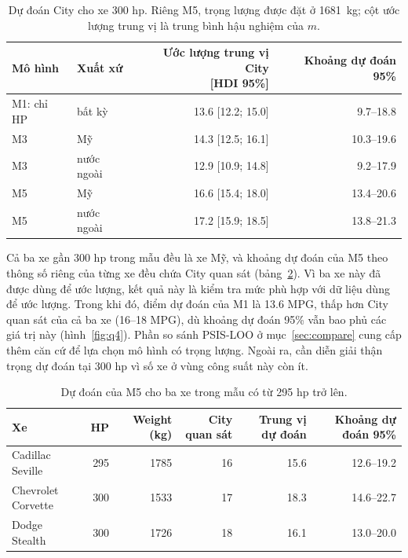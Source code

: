 \documentclass[12pt,a4paper]{report}
\begin{document}
\begin{table}[tp]
  \centering
  \caption{Dự đoán City cho xe 300 hp. Riêng M5, trọng lượng được đặt ở
    \SI{1681}{kg}; cột ước lượng trung vị là trung bình hậu nghiệm của $m$.}
  \label{tab:q4}
  \begin{tabular}{llrr}
    \toprule
    Mô hình & Xuất xứ & \shortstack{Ước lượng trung vị City\\{[HDI 95\%]}} & Khoảng dự đoán 95\% \\
    \midrule
    M1: chỉ HP & bất kỳ      & \num{13.6} [\num{12.2}; \num{15.0}] & \num{9.7}--\num{18.8} \\
    M3         & Mỹ          & \num{14.3} [\num{12.5}; \num{16.1}] & \num{10.3}--\num{19.6} \\
    M3         & nước ngoài  & \num{12.9} [\num{10.9}; \num{14.8}] & \num{9.2}--\num{17.9} \\
    M5         & Mỹ          & \num{16.6} [\num{15.4}; \num{18.0}] & \num{13.4}--\num{20.6} \\
    M5         & nước ngoài  & \num{17.2} [\num{15.9}; \num{18.5}] & \num{13.8}--\num{21.3} \\
    \bottomrule
  \end{tabular}
\end{table}

Cả ba xe gần 300 hp trong mẫu đều là xe Mỹ, và khoảng dự đoán của M5 theo thông
số riêng của từng xe đều chứa City quan sát (bảng~\ref{tab:q4-real}). Vì ba xe này
đã được dùng để ước lượng, kết quả này là kiểm tra mức phù hợp với dữ liệu
dùng để ước lượng. Trong khi đó, điểm dự đoán của M1 là \num{13.6} MPG, thấp
hơn City quan sát của cả ba xe (16--18 MPG), dù khoảng dự đoán 95\% vẫn bao
phủ các giá trị này (hình~\ref{fig:q4}). Phần so sánh PSIS-LOO ở
mục~\ref{sec:compare} cung cấp thêm căn cứ để lựa chọn mô hình có trọng lượng.
Ngoài ra, cần diễn giải thận trọng dự đoán tại 300 hp vì số xe ở vùng công
suất này còn ít.

\begin{table}[tp]
  \centering
  \caption{Dự đoán của M5 cho ba xe trong mẫu có từ 295 hp trở lên.}
  \label{tab:q4-real}
  \begin{tabular}{lrrrrr}
    \toprule
    Xe & HP & Weight (kg) & City quan sát & Trung vị dự đoán & Khoảng dự đoán 95\% \\
    \midrule
    Cadillac Seville   & 295 & \num{1785} & 16 & \num{15.6} & \num{12.6}--\num{19.2} \\
    Chevrolet Corvette & 300 & \num{1533} & 17 & \num{18.3} & \num{14.6}--\num{22.7} \\
    Dodge Stealth      & 300 & \num{1726} & 18 & \num{16.1} & \num{13.0}--\num{20.0} \\
    \bottomrule
  \end{tabular}
\end{table}
\end{document}
